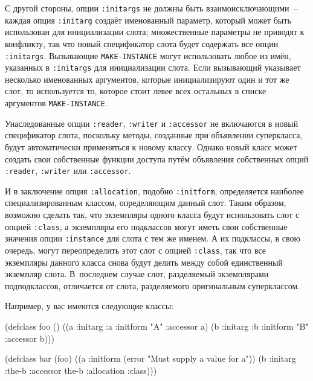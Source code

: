С другой стороны, опции \lstinline{:initargs} не должны быть взаимоисключающими~-- каждая опция
\lstinline{:initarg} создаёт именованный параметр, который может быть использован для
инициализации слота; множественные параметры не приводят к конфликту, так что новый
спецификатор слота будет содержать все опции \lstinline{:initargs}. Вызывающие
\lstinline{MAKE-INSTANCE} могут использовать любое из имён, указанных в \lstinline{:initargs} для
инициализации слота. Если вызывающий указывает несколько именованных аргументов, которые
инициализируют один и тот же слот, то используется то, которое стоит левее всех остальных
в списке аргументов \lstinline{MAKE-INSTANCE}.

Унаследованные опции \lstinline{:reader}, \lstinline{:writer} и \lstinline{:accessor} не включаются в
новый спецификатор слота, поскольку методы, созданные при объявлении суперкласса, будут
автоматически применяться к новому классу.  Однако новый класс может создать свои
собственные функции доступа путём объявления собственных опций \lstinline{:reader},
\lstinline{:writer} или \lstinline{:accessor}.

И в заключение опция \lstinline{:allocation}, подобно \lstinline{:initform}, определяется наиболее
специализированным классом, определяющим данный слот.  Таким образом, возможно сделать
так, что экземпляры одного класса будут использовать слот с опцией \lstinline{:class}, а
экземпляры его подклассов могут иметь свои собственные значения опции \lstinline{:instance} для
слота с тем же именем.  А их подклассы, в свою очередь, могут переопределить этот слот с
опцией \lstinline{:class}, так что все экземпляры данного класса снова будут делить между собой
единственный экземпляр слота.  В~последнем случае слот, разделяемый экземплярами
подподклассов, отличается от слота, разделяемого оригинальным суперклассом.

Например, у вас имеются следующие классы:

\begin{myverb}
(defclass foo ()
  ((a :initarg :a :initform "A" :accessor a)
   (b :initarg :b :initform "B" :accessor b)))

(defclass bar (foo)
  ((a :initform (error "Must supply a value for a"))
   (b :initarg :the-b :accessor the-b :allocation :class)))
\end{myverb}

